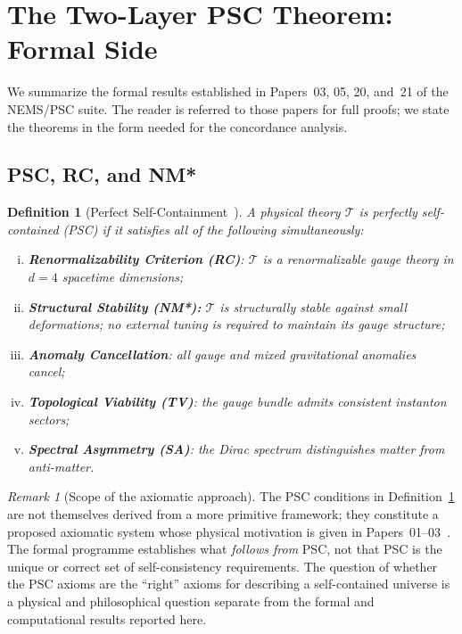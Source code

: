 \documentclass[11pt,twocolumn]{article}
\newtheorem{definition}[theorem]{Definition}
\theoremstyle{remark}
\newtheorem{remark}[theorem]{Remark}
\begin{document}
\section{The Two-Layer PSC Theorem: Formal Side}
\label{sec:formal}

We summarize the formal results established in Papers~03, 05, 20,
and~21 of the NEMS/PSC suite.
The reader is referred to those papers for full proofs; we state the
theorems in the form needed for the concordance analysis.

\subsection{PSC, RC, and NM*}
\label{sec:psc-basics}

\begin{definition}[Perfect Self-Containment~{\cite{SpivackNMstar}}]
\label{def:psc}
A physical theory $\mathcal{T}$ is \emph{perfectly self-contained}
(PSC) if it satisfies all of the following simultaneously:
\begin{enumerate}[(i)]
  \item \textbf{Renormalizability Criterion (RC)}: $\mathcal{T}$ is
        a renormalizable gauge theory in $d=4$ spacetime dimensions;
  \item \textbf{Structural Stability (NM*):} $\mathcal{T}$ is
        structurally stable against small deformations; no external
        tuning is required to maintain its gauge structure;
  \item \textbf{Anomaly Cancellation}: all gauge and mixed
        gravitational anomalies cancel;
  \item \textbf{Topological Viability (TV)}: the gauge bundle admits
        consistent instanton sectors;
  \item \textbf{Spectral Asymmetry (SA)}: the Dirac spectrum
        distinguishes matter from anti-matter.
\end{enumerate}
\end{definition}

\begin{remark}[Scope of the axiomatic approach]
The PSC conditions in Definition~\ref{def:psc} are not themselves
derived from a more primitive framework; they constitute a proposed
axiomatic system whose physical motivation is given in
Papers~01--03~\cite{SpivackPhysicsPortal,SpivackNMstar}.
The formal programme establishes what \emph{follows from} PSC, not
that PSC is the unique or correct set of self-consistency requirements.
The question of whether the PSC axioms are the ``right'' axioms for
describing a self-contained universe is a physical and philosophical
question separate from the formal and computational results
reported here.
\end{remark}
\end{document}
